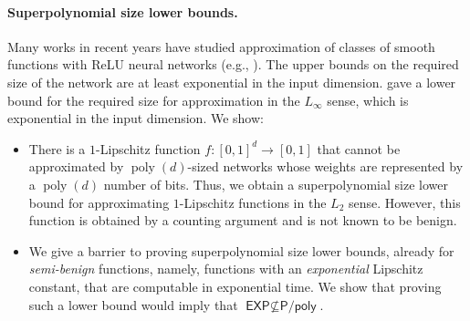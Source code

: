 \documentclass[11pt]{article}
\DeclareMathOperator{\poly}{poly}
\newcommand{\Ppoly}{\textsf{P/poly}}
\newcommand{\EXP}{\textsf{EXP}}
\begin{document}
\paragraph{Superpolynomial size lower bounds.}
Many works in recent years have studied approximation of classes of smooth functions with ReLU neural networks (e.g., \cite{guhring2020expressivity,yarotsky2017error,petersen2018optimal,yarotsky2018optimal,yarotsky2019phase,shen2019deep,lu2020deep}). The upper bounds on the required size of the network are at least exponential in the input dimension. \cite{yarotsky2017error} gave a lower bound for the required size for approximation in the $L_\infty$ sense, which is exponential in the input dimension. We show:
\begin{itemize}
	\item There is a $1$-Lipschitz function $f:[0,1]^d \rightarrow [0,1]$ that cannot be approximated by $\poly(d)$-sized networks whose weights are represented by a $\poly(d)$ number of bits. Thus, we obtain a superpolynomial size lower bound for approximating $1$-Lipschitz functions in the $L_2$ sense. However, this function is obtained by a counting argument and is not known to be benign.
	
	\item We give a barrier to proving superpolynomial size lower bounds, already for {\em semi-benign} functions, namely, functions with an \emph{exponential} Lipschitz constant, that are computable in exponential time.
	We show that proving such a lower bound would imply that $\EXP \not \subseteq \Ppoly$.
\end{itemize}
\end{document}
